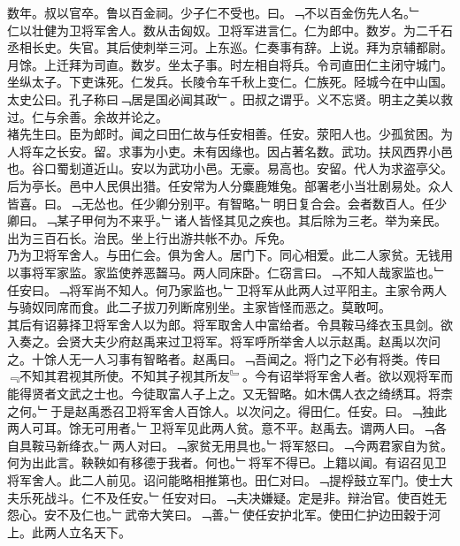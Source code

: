 \documentclass{zhvt-classic}
\begin{document}
\hspace*{2em}数年。叔以官卒。鲁以百金祠。少子仁不受也。曰。﹁不以百金伤先人名。﹂\\
\hspace*{2em}仁以壮健为卫将军舍人。数从击匈奴。卫将军进言仁。仁为郎中。数岁。为二千石丞相长史。失官。其后使刺举三河。上东巡。仁奏事有辞。上说。拜为京辅都尉。月馀。上迁拜为司直。数岁。坐太子事。时左相自将兵。令司直田仁主闭守城门。坐纵太子。下吏诛死。仁发兵。长陵令车千秋上变仁。仁族死。陉城今在中山国。\\
\hspace*{2em}太史公曰。孔子称曰﹁居是国必闻其政﹂。田叔之谓乎。义不忘贤。明主之美以救过。仁与余善。余故并论之。\\
\hspace*{2em}褚先生曰。臣为郎时。闻之曰田仁故与任安相善。任安。荥阳人也。少孤贫困。为人将车之长安。留。求事为小吏。未有因缘也。因占著名数。武功。扶风西界小邑也。谷口蜀刬道近山。安以为武功小邑。无豪。易高也。安留。代人为求盗亭父。后为亭长。邑中人民俱出猎。任安常为人分麋鹿雉兔。部署老小当壮剧易处。众人皆喜。曰。﹁无怂也。任少卿分别平。有智略。﹂明日复合会。会者数百人。任少卿曰。﹁某子甲何为不来乎。﹂诸人皆怪其见之疾也。其后除为三老。举为亲民。出为三百石长。治民。坐上行出游共帐不办。斥免。\\
\hspace*{2em}乃为卫将军舍人。与田仁会。俱为舍人。居门下。同心相爱。此二人家贫。无钱用以事将军家监。家监使养恶齧马。两人同床卧。仁窃言曰。﹁不知人哉家监也。﹂任安曰。﹁将军尚不知人。何乃家监也。﹂卫将军从此两人过平阳主。主家令两人与骑奴同席而食。此二子拔刀列断席别坐。主家皆怪而恶之。莫敢呵。\\
\hspace*{2em}其后有诏募择卫将军舍人以为郎。将军取舍人中富给者。令具鞍马绛衣玉具剑。欲入奏之。会贤大夫少府赵禹来过卫将军。将军呼所举舍人以示赵禹。赵禹以次问之。十馀人无一人习事有智略者。赵禹曰。﹁吾闻之。将门之下必有将类。传曰﹃不知其君视其所使。不知其子视其所友﹄。今有诏举将军舍人者。欲以观将军而能得贤者文武之士也。今徒取富人子上之。又无智略。如木偶人衣之绮绣耳。将柰之何。﹂于是赵禹悉召卫将军舍人百馀人。以次问之。得田仁。任安。曰。﹁独此两人可耳。馀无可用者。﹂卫将军见此两人贫。意不平。赵禹去。谓两人曰。﹁各自具鞍马新绛衣。﹂两人对曰。﹁家贫无用具也。﹂将军怒曰。﹁今两君家自为贫。何为出此言。鞅鞅如有移德于我者。何也。﹂将军不得已。上籍以闻。有诏召见卫将军舍人。此二人前见。诏问能略相推第也。田仁对曰。﹁提桴鼓立军门。使士大夫乐死战斗。仁不及任安。﹂任安对曰。﹁夫决嫌疑。定是非。辩治官。使百姓无怨心。安不及仁也。﹂武帝大笑曰。﹁善。﹂使任安护北军。使田仁护边田穀于河上。此两人立名天下。\\
\end{document}
